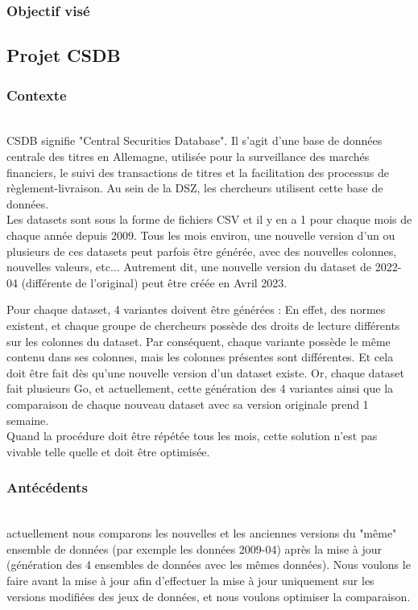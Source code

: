 \subsubsection{Objectif visé}

\pagebreak

\subsection{Projet CSDB}

\subsubsection{Contexte}
~\\
CSDB signifie "Central Securities Database". Il s'agit d'une base de données centrale des titres en Allemagne, utilisée pour la surveillance des marchés financiers, le suivi des transactions de titres et la facilitation des processus de règlement-livraison.
Au sein de la DSZ, les chercheurs utilisent cette base de données.
\\

Les datasets sont sous la forme de fichiers CSV et il y en a 1 pour chaque mois de chaque année depuis 2009.
Tous les mois environ, une nouvelle version d'un ou plusieurs de ces datasets peut parfois être générée, avec des nouvelles colonnes, nouvelles valeurs, etc...
Autrement dit, une nouvelle version du dataset de 2022-04 (différente de l'original) peut être créée en Avril 2023.

Pour chaque dataset, 4 variantes doivent être générées : En effet, des normes existent, et chaque groupe de chercheurs possède des droits de lecture différents sur les colonnes du dataset.
Par conséquent, chaque variante possède le même contenu dans ses colonnes, mais les colonnes présentes sont différentes.
Et cela doit être fait dès qu'une nouvelle version d'un dataset existe.
Or, chaque dataset fait plusieurs Go, et actuellement, cette génération des 4 variantes ainsi que la comparaison de chaque nouveau dataset avec sa version originale prend 1 semaine. 
\\

Quand la procédure doit être répétée tous les mois, cette solution n'est pas vivable telle quelle et doit être optimisée.

\subsubsection{Antécédents}
~\\
actuellement nous comparons les nouvelles et les anciennes versions du "même" ensemble de données (par exemple les données 2009-04) après la mise à jour (génération des 4 ensembles de données avec les mêmes données). 
Nous voulons le faire avant la mise à jour afin d'effectuer la mise à jour uniquement sur les versions modifiées des jeux de données, et nous voulons optimiser la comparaison.

